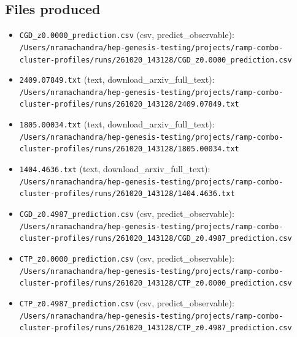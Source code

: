 \documentclass[11pt,a4paper]{article}
\begin{document}
\subsection{Files produced}
\begin{itemize}
  \item \texttt{CGD\_\allowbreak{}z0.0000\_\allowbreak{}prediction.csv} (csv, predict\_observable): \texttt{/\allowbreak{}Users/\allowbreak{}nramachandra/\allowbreak{}hep-genesis-testing/\allowbreak{}projects/\allowbreak{}ramp-combo-cluster-profiles/\allowbreak{}runs/\allowbreak{}261020\_\allowbreak{}143128/\allowbreak{}CGD\_\allowbreak{}z0.0000\_\allowbreak{}prediction.csv}
  \item \texttt{2409.07849.txt} (text, download\_arxiv\_full\_text): \texttt{/\allowbreak{}Users/\allowbreak{}nramachandra/\allowbreak{}hep-genesis-testing/\allowbreak{}projects/\allowbreak{}ramp-combo-cluster-profiles/\allowbreak{}runs/\allowbreak{}261020\_\allowbreak{}143128/\allowbreak{}2409.07849.txt}
  \item \texttt{1805.00034.txt} (text, download\_arxiv\_full\_text): \texttt{/\allowbreak{}Users/\allowbreak{}nramachandra/\allowbreak{}hep-genesis-testing/\allowbreak{}projects/\allowbreak{}ramp-combo-cluster-profiles/\allowbreak{}runs/\allowbreak{}261020\_\allowbreak{}143128/\allowbreak{}1805.00034.txt}
  \item \texttt{1404.4636.txt} (text, download\_arxiv\_full\_text): \texttt{/\allowbreak{}Users/\allowbreak{}nramachandra/\allowbreak{}hep-genesis-testing/\allowbreak{}projects/\allowbreak{}ramp-combo-cluster-profiles/\allowbreak{}runs/\allowbreak{}261020\_\allowbreak{}143128/\allowbreak{}1404.4636.txt}
  \item \texttt{CGD\_\allowbreak{}z0.4987\_\allowbreak{}prediction.csv} (csv, predict\_observable): \texttt{/\allowbreak{}Users/\allowbreak{}nramachandra/\allowbreak{}hep-genesis-testing/\allowbreak{}projects/\allowbreak{}ramp-combo-cluster-profiles/\allowbreak{}runs/\allowbreak{}261020\_\allowbreak{}143128/\allowbreak{}CGD\_\allowbreak{}z0.4987\_\allowbreak{}prediction.csv}
  \item \texttt{CTP\_\allowbreak{}z0.0000\_\allowbreak{}prediction.csv} (csv, predict\_observable): \texttt{/\allowbreak{}Users/\allowbreak{}nramachandra/\allowbreak{}hep-genesis-testing/\allowbreak{}projects/\allowbreak{}ramp-combo-cluster-profiles/\allowbreak{}runs/\allowbreak{}261020\_\allowbreak{}143128/\allowbreak{}CTP\_\allowbreak{}z0.0000\_\allowbreak{}prediction.csv}
  \item \texttt{CTP\_\allowbreak{}z0.4987\_\allowbreak{}prediction.csv} (csv, predict\_observable): \texttt{/\allowbreak{}Users/\allowbreak{}nramachandra/\allowbreak{}hep-genesis-testing/\allowbreak{}projects/\allowbreak{}ramp-combo-cluster-profiles/\allowbreak{}runs/\allowbreak{}261020\_\allowbreak{}143128/\allowbreak{}CTP\_\allowbreak{}z0.4987\_\allowbreak{}prediction.csv}

\end{itemize}
\end{document}
